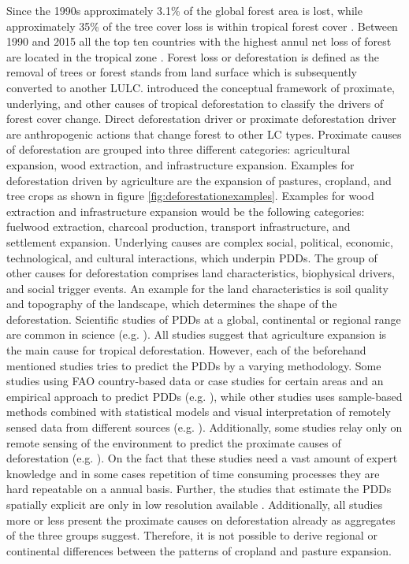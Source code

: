 	Since the 1990s approximately 3.1\% of the global forest area is lost, while approximately 35\% of the tree cover loss is within tropical forest cover \citep{FAO2016}. Between 1990 and 2015 all the top ten countries with the highest annul net loss of forest are located in the tropical zone \citep{FAO2010,FAO2016}. Forest loss or deforestation is defined as the removal of trees or forest stands from land surface which is subsequently converted to another \ac{LULC}. \citet{Geist2001} introduced the conceptual framework of proximate, underlying, and other causes of tropical deforestation to classify the drivers of forest cover change. Direct deforestation driver or proximate deforestation driver are anthropogenic actions that change forest to other \ac{LC} types. Proximate causes of deforestation are grouped into three different categories: agricultural expansion, wood extraction, and infrastructure expansion. Examples for deforestation driven by agriculture are the expansion of pastures, cropland, and tree crops as shown in figure \ref{fig:deforestationexamples}. Examples for wood extraction and infrastructure expansion would be the following categories: fuelwood extraction, charcoal production, transport infrastructure, and settlement expansion. Underlying causes are complex social, political, economic, technological, and cultural interactions, which underpin \acp{PDD}. The group of other causes for deforestation comprises land characteristics, biophysical drivers, and social trigger events. An example for the land characteristics is soil quality and topography of the landscape, which determines the shape of the deforestation. Scientific studies of \acp{PDD} at a global, continental or regional range are common in science (e.g. \citet{Curtis2018,Hosonuma2012,Sy2015,Austin2019,Boucher2011,DeFries2010,Zalles2018,Carter2018,Ickowitz2015,Meyfroidt2013,Caldas2013}). All studies suggest that agriculture expansion is the main cause for tropical deforestation. However, each of the beforehand mentioned studies tries to predict the \acp{PDD} by a varying methodology. Some studies using \ac{FAO} country-based data or case studies for certain areas and an empirical approach to predict \acp{PDD} (e.g. \citet{Hosonuma2012,Sy2015}), while other studies uses sample-based methods combined with statistical models and visual interpretation of remotely sensed data from different sources (e.g. \citet{Hosonuma2012,Sy2015,Austin2019,Curtis2018}). Additionally, some studies relay only on remote sensing of the environment to predict the proximate causes of deforestation (e.g. \citet{Caldas2013}). On the fact that these studies need a vast amount of expert knowledge and in some cases repetition of time consuming processes they are hard repeatable on a annual basis. Further, the studies that estimate the \acp{PDD} spatially explicit are only in low resolution available \citep{Curtis2018,Caldas2013}. Additionally, all studies more or less present the proximate causes on deforestation already as aggregates of the three groups \citeauthor{Geist2001} suggest. Therefore, it is not possible to derive regional or continental differences between the patterns of cropland and pasture expansion.
